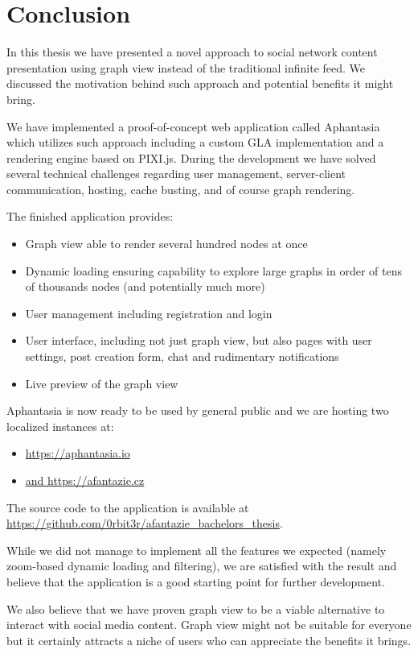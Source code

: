 \chapter{Conclusion}

In this thesis we have presented a novel approach to social network content presentation using graph view
instead of the traditional infinite feed.
We discussed the motivation behind such approach and potential benefits it might bring.

We have implemented a proof-of-concept web application called Aphantasia which utilizes such approach including 
a custom \gls{GLA} implementation and a rendering engine based on PIXI.js.
During the development we have solved several technical challenges regarding user management,
server-client communication, hosting, cache busting, and of course graph rendering.

The finished application provides:
\begin{itemize}
    \item Graph view able to render several hundred nodes at once
    \item Dynamic loading ensuring capability to explore large graphs in order of tens of thousands nodes (and potentially much more)
    \item User management including registration and login
    \item User interface, including not just graph view, but also pages with user settings, post creation form, chat
    and rudimentary notifications
    \item Live preview of the graph view
\end{itemize}

Aphantasia is now ready to be used by general public and we are hosting two localized instances at:
\begin{itemize}
    \item \url{https://aphantasia.io}
    \item \url{and https://afantazie.cz}
\end{itemize}

The source code to the application is available at \url{https://github.com/0rbit3r/afantazie_bachelors_thesis}.

While we did not manage to implement all the features we expected (namely zoom-based dynamic loading and filtering),
we are satisfied with the result and believe that the application is a good starting point for further development.

We also believe that we have proven graph view to be a viable alternative to interact with social media content.
Graph view might not be suitable for everyone but it certainly attracts a niche of users who can appreciate the benefits it brings.